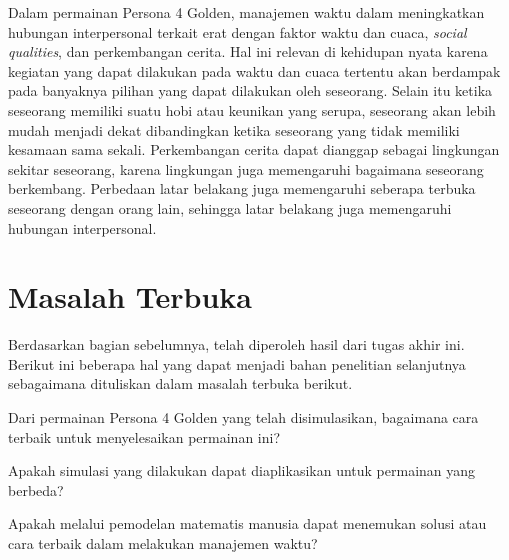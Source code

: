Dalam permainan Persona 4 Golden, manajemen waktu dalam meningkatkan hubungan interpersonal terkait erat dengan faktor waktu dan cuaca, \textit{social qualities}, dan perkembangan cerita. Hal ini relevan di kehidupan nyata karena kegiatan yang dapat dilakukan pada waktu dan cuaca tertentu akan berdampak pada banyaknya pilihan yang dapat dilakukan oleh seseorang. Selain itu ketika seseorang memiliki suatu hobi atau keunikan yang serupa, seseorang akan lebih mudah menjadi dekat dibandingkan ketika seseorang yang tidak memiliki kesamaan sama sekali. Perkembangan cerita dapat dianggap sebagai lingkungan sekitar seseorang, karena lingkungan juga memengaruhi bagaimana seseorang berkembang. Perbedaan latar belakang juga memengaruhi seberapa terbuka seseorang dengan orang lain, sehingga latar belakang juga memengaruhi hubungan interpersonal.


\section{Masalah Terbuka}
Berdasarkan bagian sebelumnya, telah diperoleh hasil dari tugas akhir ini. Berikut ini beberapa hal yang dapat menjadi bahan penelitian selanjutnya sebagaimana dituliskan dalam masalah terbuka berikut.

\pagebreak

\begin{mater}
    \normalfont
    Dari permainan Persona 4 Golden yang telah disimulasikan, bagaimana cara terbaik untuk menyelesaikan permainan ini?
\end{mater}

\begin{mater}
    \normalfont
    Apakah simulasi yang dilakukan dapat diaplikasikan untuk permainan yang berbeda?
\end{mater}

\begin{mater}
    \normalfont
    Apakah melalui pemodelan matematis manusia dapat menemukan solusi atau cara terbaik dalam melakukan manajemen waktu?
\end{mater}
